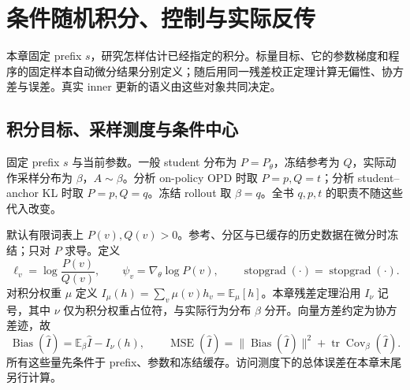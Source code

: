 \documentclass[lang=cn,scheme=chinese,openany]{../book/elegantbook}
\newcommand{\E}{\mathbb E}
\newcommand{\sg}{\operatorname{stopgrad}}
\begin{document}




\chapter{条件随机积分、控制与实际反传}
\label{est:chapter}

本章固定 prefix $s$，研究怎样估计已经指定的积分。标量目标、它的参数梯度和程序的固定样本自动微分结果分别定义；随后用同一残差校正定理计算无偏性、协方差与误差。真实 inner 更新的语义由这些对象共同决定。


\section{积分目标、采样测度与条件中心}
\label{est:targets}

固定 prefix $s$ 与当前参数。一般 student 分布为 $P=P_\theta$，冻结参考为 $Q$，实际动作采样分布为 $\beta$，$A\sim\beta$。分析 on-policy OPD 时取 $P=p,Q=t$；分析 student--anchor KL 时取 $P=p,Q=q$。冻结 rollout 取 $\beta=q$。全书 $q,p,t$ 的职责不随这些代入改变。

默认有限词表上 $P(v),Q(v)>0$。参考、分区与已缓存的历史数据在微分时冻结；只对 $P$ 求导。定义
\begin{equation}
\ell_v=\log\frac{P(v)}{Q(v)},\qquad
\psi_v=\nabla_\theta\log P(v),\qquad
\sg(\cdot)=\operatorname{stopgrad}(\cdot).
\end{equation}
对积分权重 $\mu$ 定义 $I_\mu(h)=\sum_v\mu(v)h_v=\E_\mu[h]$。本章残差定理沿用 $I_\nu$ 记号，其中 $\nu$ 仅为积分权重占位符，与实际行为分布 $\beta$ 分开。向量方差约定为协方差迹，故
\begin{equation}
\operatorname{Bias}(\widehat I)=\E_\beta\widehat I-I_\nu(h),\qquad
\operatorname{MSE}(\widehat I)=\|\operatorname{Bias}(\widehat I)\|^2+\operatorname{tr}\operatorname{Cov}_\beta(\widehat I).
\end{equation}
所有这些量先条件于 prefix、参数和冻结缓存。访问测度下的总体误差在本章末尾另行计算。
\end{document}
